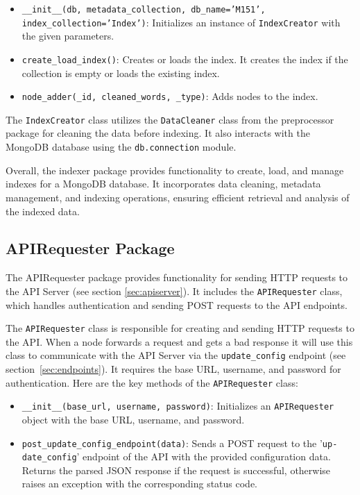 \documentclass{article}
\begin{document}
\begin{itemize}
    \item \texttt{\_\_init\_\_(db, metadata\_collection, db\_name='M151', \\
    index\_collection='Index')}: Initializes an instance of \texttt{IndexCreator} with the given 
    parameters.
    \item \texttt{create\_load\_index()}: Creates or loads the index. It creates the index if 
    the collection is empty or loads the existing index.
    \item \texttt{node\_adder(\_id, cleaned\_words, \_type)}: Adds nodes to the index.
\end{itemize}

The \texttt{IndexCreator} class utilizes the \texttt{DataCleaner} class from the preprocessor 
package for cleaning the data before indexing. It also interacts with the MongoDB database using 
the \texttt{db.connection} module.

Overall, the indexer package provides functionality to create, load, and manage indexes for a 
MongoDB database. It incorporates data cleaning, metadata management, and indexing operations, 
ensuring efficient retrieval and analysis of the indexed data.


\subsection{APIRequester Package}

The APIRequester package provides functionality for sending HTTP requests to the API Server 
(see section \ref{sec:apiserver}). It includes the \texttt{APIRequester} class, which handles 
authentication and sending POST requests to the 
API endpoints.


The \texttt{APIRequester} class is responsible for creating and sending HTTP requests to the 
API. When a node forwards a request and gets a bad response it will use this class to communicate 
with the API Server via the \texttt{update\_config} endpoint (see section~\ref{sec:endpoints}). 
It requires the base URL, username, and password for authentication. Here are the key methods 
of the \texttt{APIRequester} class:

\begin{itemize}
    \item \texttt{\_\_init\_\_(base\_url, username, password)}: Initializes an 
    \texttt{APIRequester} object with the base URL, username, and password.
    \item \texttt{post\_update\_config\_endpoint(data)}: Sends a POST request to the 
    '\texttt{up-\\date\_config}' endpoint of the API with the provided configuration data. Returns the 
    parsed JSON response if the request is successful, otherwise raises an exception with the 
    corresponding status code.
\end{itemize}
\end{document}
